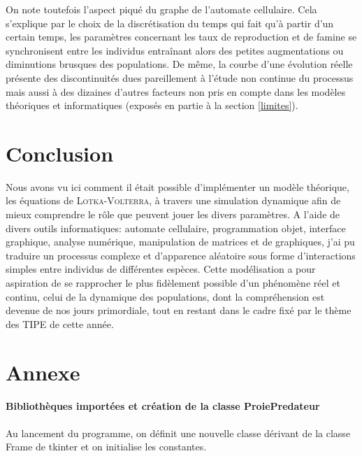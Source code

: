 \documentclass[11pt]{article}
\begin{document}
On note toutefois l'aspect piqué du graphe de l'automate cellulaire. Cela s'explique par le choix de la discrétisation du temps qui fait qu'à partir d'un certain temps, les paramètres concernant les taux de reproduction et de famine se synchronisent entre les individus entraînant alors des petites augmentations ou diminutions brusques des populations. De même, la courbe d'une évolution réelle présente des discontinuités dues pareillement à l'étude non continue du processus mais aussi à des dizaines d'autres facteurs non pris en compte dans les modèles théoriques et informatiques (exposés en partie à la section \ref{limites}).

\section{Conclusion}

Nous avons vu ici comment il était possible d'implémenter un modèle théorique, les équations de \textsc{Lotka-Volterra}, à travers une simulation dynamique afin de mieux comprendre le rôle que peuvent jouer les divers paramètres. A l'aide de divers outils informatiques: automate cellulaire, programmation objet, interface graphique, analyse numérique, manipulation de matrices et de graphiques, j'ai pu traduire un processus complexe et d'apparence aléatoire sous forme d'interactions simples entre individus de différentes espèces. Cette modélisation a pour aspiration de se rapprocher le plus fidèlement possible d'un phénomène réel et continu, celui de la dynamique des populations, dont la compréhension est devenue de nos jours primordiale, tout en restant dans le cadre fixé par le thème des TIPE de cette année.

\newpage
\section{Annexe}\label{annexe}

\paragraph{Bibliothèques importées et création de la classe \textsf{ProiePredateur}}
Au lancement du programme, on définit une nouvelle classe dérivant de la classe \textsf{Frame} de \textsf{tkinter} et on initialise les constantes.
\end{document}
